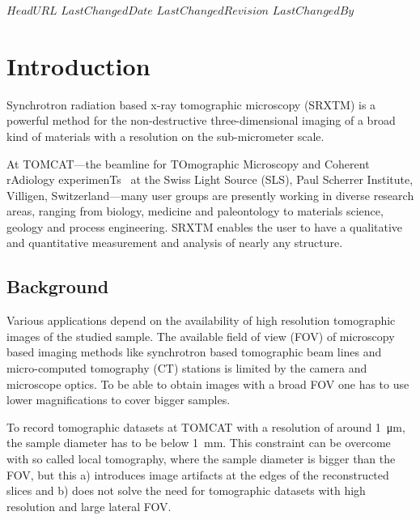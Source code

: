 \svnidlong
{$HeadURL$}
{$LastChangedDate$}
{$LastChangedRevision$}
{$LastChangedBy$}

\ifhtml
\else
\begin{center}
\end{center}
\fi

\section{Introduction}
Synchrotron radiation based x-ray tomographic microscopy (SRXTM) is a powerful method for the non-destructive three-dimensional imaging of a broad kind of materials with a resolution on the sub-micrometer scale.

At TOMCAT---the beamline for TOmographic Microscopy and Coherent rAdiology experimenTs~\cite{Stampanoni2007} at the Swiss Light Source (SLS), Paul Scherrer Institute, Villigen, Switzerland---many user groups are presently working in diverse research areas, ranging from biology, medicine and paleontology to materials science, geology and process engineering. SRXTM enables the user to have a qualitative and quantitative measurement and analysis of nearly any structure.

\subsection{Background}
Various applications depend on the availability of high resolution tomographic images of the studied sample. The available field of view (FOV) of microscopy based imaging methods like synchrotron based tomographic beam lines and micro-computed tomography (\micro CT) stations is limited by the camera and microscope optics. To be able to obtain images with a broad FOV one has to use lower magnifications to cover bigger samples.

To record tomographic datasets at TOMCAT with a resolution of around \SI{1}{\micro\meter}, the sample diameter has to be below \SI{1}{\milli\meter}. This constraint can be overcome with so called local tomography, where the sample diameter is bigger than the FOV, but this a) introduces image artifacts at the edges of the reconstructed slices and b) does not solve the need for tomographic datasets with high resolution and large lateral FOV.

